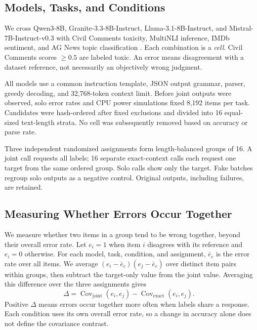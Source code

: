 \documentclass[conference]{IEEEtran}
\newcommand{\joint}{\mathrm{joint}}
\newcommand{\exact}{\mathrm{exact}}
\begin{document}
\subsection{Models, Tasks, and Conditions}
We cross Qwen3-8B, Granite-3.3-8B-Instruct, Llama-3.1-8B-Instruct, and Mistral-7B-Instruct-v0.3 \cite{yang2025qwen3,ibm2025granite,dubey2024llama,mistral2024v03} with Civil Comments toxicity, MultiNLI inference, IMDb sentiment, and AG News topic classification \cite{borkan2019civil,williams2018multinli,maas2011imdb,zhang2015character}. Each combination is a \emph{cell}. Civil Comments scores $\geq0.5$ are labeled toxic. An error means disagreement with a dataset reference, not necessarily an objectively wrong judgment.

All models use a common instruction template, JSON output grammar, parser, greedy decoding, and 32,768-token context limit. Before joint outputs were observed, solo error rates and CPU power simulations fixed 8,192 items per task. Candidates were hash-ordered after fixed exclusions and divided into 16 equal-sized text-length strata. No cell was subsequently removed based on accuracy or parse rate.

Three independent randomized assignments form length-balanced groups of 16. A joint call requests all labels; 16 separate exact-context calls each request one target from the same ordered group. Solo calls show only the target. Fake batches regroup solo outputs as a negative control. Original outputs, including failures, are retained.

\subsection{Measuring Whether Errors Occur Together}
We measure whether two items in a group tend to be wrong together, beyond their overall error rate. Let $e_i=1$ when item $i$ disagrees with its reference and $e_i=0$ otherwise. For each model, task, condition, and assignment, $\bar e_c$ is the error rate over all items. We average $(e_i-\bar e_c)(e_j-\bar e_c)$ over distinct item pairs within groups, then subtract the target-only value from the joint value. Averaging this difference over the three assignments gives
\begin{equation}
\Delta=\operatorname{Cov}_{\joint}(e_i,e_j)-\operatorname{Cov}_{\exact}(e_i,e_j).
\label{eq:delta}
\end{equation}
Positive $\Delta$ means errors occur together more often when labels share a response. Each condition uses its own overall error rate, so a change in accuracy alone does not define the covariance contrast.
\end{document}
